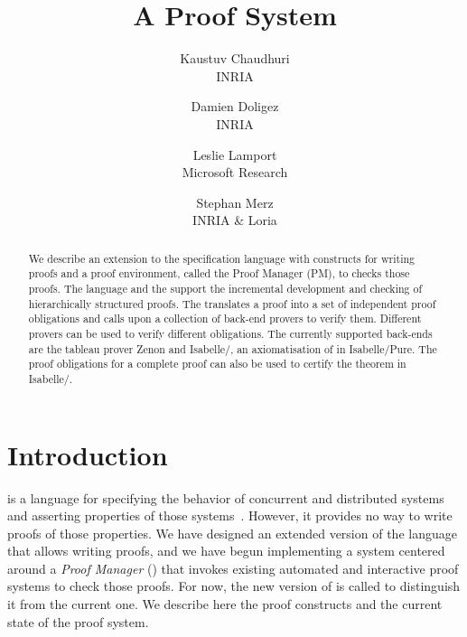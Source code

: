 \documentclass[a4paper]{easychair}
\begin{document}
\title{A \tlaplus Proof System}




\author{
  Kaustuv Chaudhuri \\
  INRIA \\
  \and
  Damien Doligez \\
  INRIA \\
  \and
  Leslie Lamport \\
  Microsoft Research \\
  \and
  Stephan Merz \\
  INRIA \& Loria
}


\maketitle

\begin{abstract}
  We describe an extension to the \tlaplus specification language
  with constructs for writing proofs and a proof environment, called
  the Proof Manager (PM), to checks those proofs.  The language and
  the \PM support the incremental development and checking of
  hierarchically structured proofs.  The \PM translates a proof into
  a set of independent proof obligations and calls upon a collection
  of back-end provers to verify them.  Different provers can be used
  to verify different obligations.  The currently supported back-ends
  are the tableau prover Zenon and Isabelle/\tlaplus, an
  axiomatisation of \tlaplus in Isabelle/Pure.  The proof obligations
  for a complete \tlatwo proof can also be used to certify the theorem
  in Isabelle/\tlaplus.
\end{abstract}

\section{Introduction}
\label{sec:intro}

\tlaplus is a language for specifying the behavior of concurrent and
distributed systems and asserting properties of those
systems~\cite{lamport03tla}.  However, it provides no way to write
proofs of those properties.  We have designed an extended version of
the language that allows writing proofs, and we have begun
implementing a system centered around a \textit{Proof Manager} (\PM)
that invokes existing automated and interactive proof systems to check
those proofs. For now, the new version of \tlaplus is called \tlatwo
to distinguish it from the current one.  We describe here the \tlatwo
proof constructs and the current state of the proof system.
\end{document}
